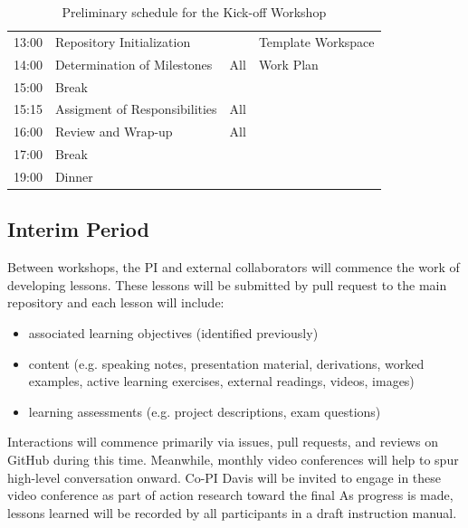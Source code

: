 \documentclass[11pt]{article}
\begin{document}
\begin{table}[h!]
\begin{tabularx}{\textwidth}{r|l|l|X}
13:00& Repository Initialization&&  Template Workspace\\
14:00& Determination of Milestones& All& Work Plan\\
15:00& Break&&  \\
15:15& Assigment of Responsibilities& All&  \\
16:00& Review and Wrap-up& All&  \\
17:00& Break&&  \\
19:00& Dinner&&  \\
\hline
                  \end{tabularx}
                  \caption{Preliminary schedule for the Kick-off Workshop}
                  \label{tab:kickoff}
          \end{table}


          \subsection{Interim Period}
          Between workshops, the PI and external collaborators will commence 
          the work of  developing 
          lessons. These lessons will be submitted by pull request to the main 
          repository and each lesson will include:
          \begin{itemize} 
                  \item associated learning objectives (identified previously)
                \item content (e.g. speaking notes, presentation material, 
                        derivations, worked examples, active learning  
                          exercises, external readings, videos, images)
                  \item learning assessments (e.g. project descriptions, exam questions) 
          \end{itemize} 

          Interactions will commence primarily via issues, pull requests, and 
          reviews on GitHub during this time. Meanwhile, monthly video 
          conferences will help to spur high-level conversation onward.
          Co-PI Davis will be invited to engage in these video conference as 
          part of action research toward the final 
          As progress is made, lessons learned will be recorded by all 
          participants in a draft instruction manual. 
\end{document}
